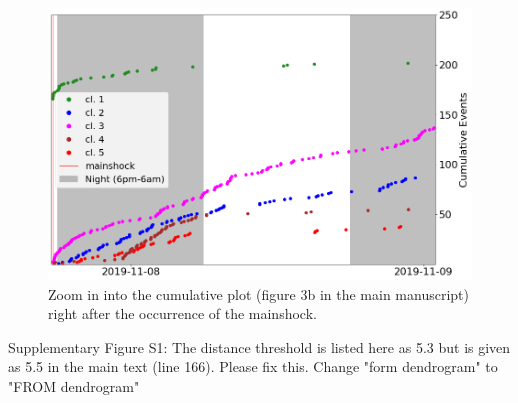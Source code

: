 \documentclass[10pt]{extarticle}
\begin{document}
\begin{Answer}
\begin{figure}[!h]
\end{figure}
\begin{figure}[!h]
\begin{center}
 \includegraphics[width=1\linewidth]{S4_cumulative_per_cluster_zoom.png} 
\end{center}
\caption{Zoom in into the cumulative plot (figure 3b in the main manuscript) right after the occurrence of the mainshock.}
\end{figure}
 \WorkInProgressRevTask
\end{Answer}
%
%



\begin{ReviewerComment}{2}
\noindent 
Supplementary Figure S1: The distance threshold is listed here as 5.3 but is given as 5.5 in the main text (line 166). Please fix this. Change "form dendrogram" to "FROM dendrogram"
\end{ReviewerComment}
\end{document}
